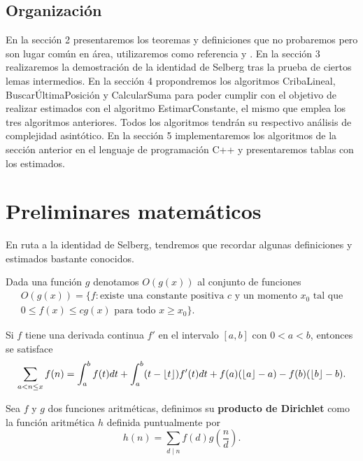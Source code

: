 \subsection{Organizaci\'on}
En la secci\'on 2 presentaremos los teoremas y definiciones que no probaremos pero 
son lugar com\'un en \'area, utilizaremos como referencia \cite{Apostol} y \cite{CLRS}.
En la secci\'on 3 realizaremos la demostraci\'on de la identidad de Selberg tras la prueba de ciertos lemas intermedios.
En la secci\'on 4 propondremos los algoritmos CribaLineal, Buscar\'UltimaPosici\'on y CalcularSuma 
para poder cumplir con el objetivo de realizar estimados con el algoritmo EstimarConstante, el mismo que emplea los tres algoritmos anteriores. 
Todos los algoritmos tendr\'an su respectivo an\'alisis de complejidad asint\'otico.
En la secci\'on 5 implementaremos los algoritmos de la secci\'on anterior en el lenguaje de programaci\'on C++ y
presentaremos tablas con los estimados.

\section{Preliminares matem\'aticos}

En ruta a la identidad de Selberg, tendremos que recordar algunas definiciones y estimados bastante conocidos.

\begin{defn}
Dada una funci\'on $g$ denotamos $O(g(x))$ al conjunto de funciones
\[
\begin{gathered}
O(g(x)) = \{f : \text{existe una constante positiva } c \text{ y un momento } x_0 \text{ tal que}\\
0 \leq f(x) \leq cg(x) \text{ para todo } x \geq x_0\}.
\end{gathered}
\]
\end{defn}

\begin{theorem}
Si $f$ tiene una derivada continua $f'$ en el intervalo $[a, b]$ con $0 < a < b$, 
entonces se satisface 
\[
\sum_{a < n \leq x} f(n) = \int_a^b f(t) dt + \int_a^b (t - \left\lfloor t \right\rfloor) f'(t) dt
+ f(a)(\left\lfloor a \right\rfloor - a) - f(b)(\left\lfloor b \right\rfloor - b).
\]
\end{theorem}

\begin{defn}\label{def03}
Sea $f$ y $g$ dos funciones aritm\'eticas, 
definimos su {\bf producto de Dirichlet} como la funci\'on aritm\'etica $h$ definida puntualmente por 
\[
h(n) = \sum_{d \mid n} f(d) g\left(\frac{n}{d}\right).
\]
\end{defn}

